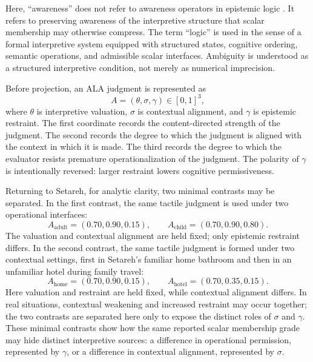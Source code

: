 \documentclass[reqno,final]{amsart}
\theoremstyle{definition}
\theoremstyle{plain}
\theoremstyle{remark}
\begin{document}
Here, ``awareness'' does not refer to awareness operators in epistemic logic \cite{FaginHalpern1988,FaginHalpernMosesVardi1995}. It refers to preserving awareness of the interpretive structure that scalar membership may otherwise compress. The term ``logic'' is used in the sense of a formal interpretive system equipped with structured states, cognitive ordering, semantic operations, and admissible scalar interfaces. Ambiguity is understood as a structured interpretive condition, not merely as numerical imprecision.

Before projection, an ALA judgment is represented as
\[
A=(\theta,\sigma,\gamma)\in[0,1]^3,
\]
where \(\theta\) is interpretive valuation, \(\sigma\) is contextual alignment, and \(\gamma\) is epistemic restraint. The first coordinate records the content-directed strength of the judgment. The second records the degree to which the judgment is aligned with the context in which it is made. The third records the degree to which the evaluator resists premature operationalization of the judgment. The polarity of \(\gamma\) is intentionally reversed: larger restraint lowers cognitive permissiveness.

Returning to Setareh, for analytic clarity, two minimal contrasts may be separated. In the first contrast, the same tactile judgment is used under two operational interfaces:
\[
A_{\mathrm{adult}}=(0.70,0.90,0.15),
\qquad
A_{\mathrm{child}}=(0.70,0.90,0.80).
\]
The valuation and contextual alignment are held fixed; only epistemic restraint differs. In the second contrast, the same tactile judgment is formed under two contextual settings, first in Setareh's familiar home bathroom and then in an unfamiliar hotel during family travel:
\[
A_{\mathrm{home}}=(0.70,0.90,0.15),
\qquad
A_{\mathrm{hotel}}=(0.70,0.35,0.15).
\]
Here valuation and restraint are held fixed, while contextual alignment differs. In real situations, contextual weakening and increased restraint may occur together; the two contrasts are separated here only to expose the distinct roles of \(\sigma\) and \(\gamma\). These minimal contrasts show how the same reported scalar membership grade may hide distinct interpretive sources: a difference in operational permission, represented by \(\gamma\), or a difference in contextual alignment, represented by \(\sigma\). 
\end{document}
